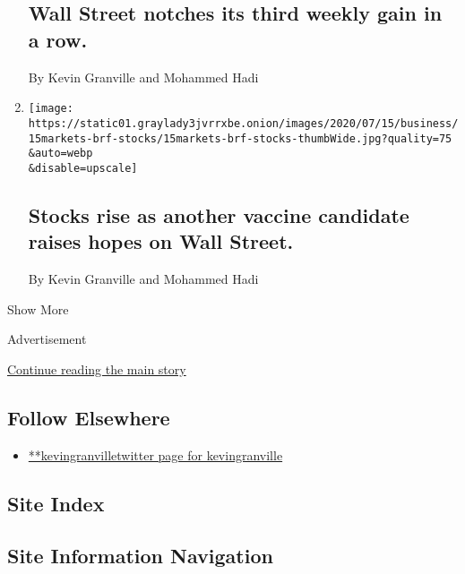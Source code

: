 \begin{enumerate}
{  \subsection{Wall Street notches its third weekly gain in a
  row.}\label{wall-street-notches-its-third-weekly-gain-in-a-row}}

  By Kevin Granville and Mohammed Hadi
\item
  \href{/live/2020/07/15/business/stock-market-today-coronavirus/stocks-rise-as-another-vaccine-candidate-raises-hopes-on-wall-street}{}

  \texttt{[image: https://static01.graylady3jvrrxbe.onion/images/2020/07/15/business/15markets-brf-stocks/15markets-brf-stocks-thumbWide.jpg?quality=75\\\&auto=webp\\\&disable=upscale]}

  \hypertarget{stocks-rise-as-another-vaccine-candidate-raises-hopes-on-wall-street}{%
  \subsection{Stocks rise as another vaccine candidate raises hopes on
  Wall
  Street.}\label{stocks-rise-as-another-vaccine-candidate-raises-hopes-on-wall-street}}

  By Kevin Granville and Mohammed Hadi
\end{enumerate}

Show More

Advertisement

\protect\hyperlink{after-mid2}{Continue reading the main story}

\hypertarget{follow-elsewhere}{%
\subsection{Follow Elsewhere}\label{follow-elsewhere}}

\begin{itemize}
\tightlist
\item
  \href{https://twitter.com/kevingranville}{**kevingranvilletwitter page
  for kevingranville}
\end{itemize}

\hypertarget{site-index}{%
\subsection{Site Index}\label{site-index}}

\hypertarget{site-information-navigation}{%
\subsection{Site Information
Navigation}\label{site-information-navigation}}

